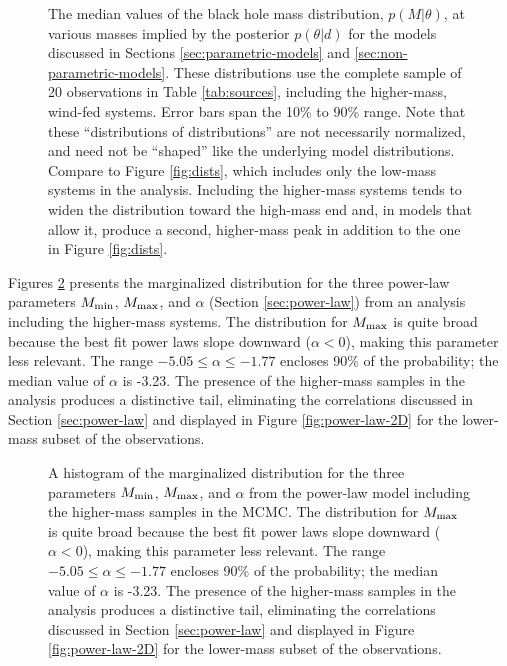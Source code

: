 \documentclass[preprint]{aastex}
\newcommand{\Mmin}{M_{\textnormal{min}}}
\newcommand{\Mmax}{M_{\textnormal{max}}}
\begin{document}
\begin{figure}
  \begin{center}
  \end{center}
  \caption{\label{fig:high-mass-dists} The median values of the black
    hole mass distribution, $p(M|\theta)$, at various masses implied
    by the posterior $p(\theta|d)$ for the models discussed in
    Sections \ref{sec:parametric-models} and
    \ref{sec:non-parametric-models}.  These distributions use the
    complete sample of 20 observations in Table \ref{tab:sources},
    including the higher-mass, wind-fed systems.  Error bars span the
    10\% to 90\% range.  Note that these ``distributions of
    distributions'' are not necessarily normalized, and need not be
    ``shaped'' like the underlying model distributions.  Compare to
    Figure \ref{fig:dists}, which includes only the low-mass systems
    in the analysis.  Including the higher-mass systems tends to widen
    the distribution toward the high-mass end and, in models that
    allow it, produce a second, higher-mass peak in addition to the
    one in Figure \ref{fig:dists}. }
\end{figure}

Figures \ref{fig:power-law-high} presents the marginalized
distribution for the three power-law parameters $\Mmin$, $\Mmax$, and
$\alpha$ (Section \ref{sec:power-law}) from an analysis including the
higher-mass systems.  The distribution for $\Mmax$ is quite broad
because the best fit power laws slope downward ($\alpha < 0$), making
this parameter less relevant.  The range $-5.05 \leq \alpha \leq
-1.77$ encloses 90\% of the probability; the median value of $\alpha$
is -3.23.  The presence of the higher-mass samples in the analysis
produces a distinctive tail, eliminating the correlations discussed in
Section \ref{sec:power-law} and displayed in Figure
\ref{fig:power-law-2D} for the lower-mass subset of the observations.

\begin{figure}
  \begin{center}
  \end{center}
  \caption{\label{fig:power-law-high} A histogram of the marginalized
    distribution for the three parameters $\Mmin$, $\Mmax$, and
    $\alpha$ from the power-law model including the higher-mass
    samples in the MCMC.  The distribution for $\Mmax$ is quite broad
    because the best fit power laws slope downward ($\alpha < 0$),
    making this parameter less relevant.  The range $-5.05 \leq \alpha
    \leq -1.77$ encloses 90\% of the probability; the median value of
    $\alpha$ is -3.23.  The presence of the higher-mass samples in the
    analysis produces a distinctive tail, eliminating the correlations
    discussed in Section \ref{sec:power-law} and displayed in Figure
    \ref{fig:power-law-2D} for the lower-mass subset of the
    observations. }
\end{figure}
\end{document}
